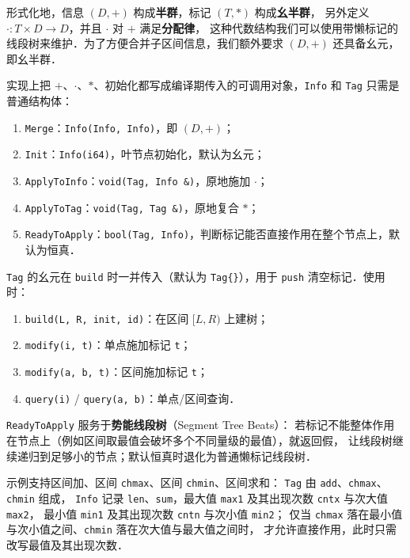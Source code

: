 形式化地，信息 $(D, +)$ 构成{\bf 半群}，标记 $(T, *)$ 构成{\bf 幺半群}，
另外定义 $\cdot: T \times D \rightarrow D$，并且 $\cdot$ 对 $+$ 满足{\bf 分配律}，
这种代数结构我们可以使用带懒标记的线段树来维护．为了方便合并子区间信息，我们额外要求 $(D, +)$ 还具备幺元，即幺半群．

实现上把 $+$、$\cdot$、$*$、初始化都写成编译期传入的可调用对象，{\tt Info} 和 {\tt Tag} 只需是普通结构体：

\begin{enumerate}[noitemsep]
    \item {\tt Merge}：{\tt Info(Info, Info)}，即 $(D, +)$；
    \item {\tt Init}：{\tt Info(i64)}，叶节点初始化，默认为幺元；
    \item {\tt ApplyToInfo}：{\tt void(Tag, Info \&)}，原地施加 $\cdot$；
    \item {\tt ApplyToTag}：{\tt void(Tag, Tag \&)}，原地复合 $*$；
    \item {\tt ReadyToApply}：{\tt bool(Tag, Info)}，判断标记能否直接作用在整个节点上，默认为恒真．
\end{enumerate}

{\tt Tag} 的幺元在 {\tt build} 时一并传入（默认为 {\tt Tag\{\}}），用于 {\tt push} 清空标记．使用时：

\begin{enumerate}[noitemsep]
    \item {\tt build(L, R, init, id)}：在区间 $[L, R)$ 上建树；
    \item {\tt modify(i, t)}：单点施加标记 {\tt t}；
    \item {\tt modify(a, b, t)}：区间施加标记 {\tt t}；
    \item {\tt query(i)} / {\tt query(a, b)}：单点/区间查询．
\end{enumerate}

{\tt ReadyToApply} 服务于{\bf 势能线段树}（Segment Tree Beats）：
若标记不能整体作用在节点上（例如区间取最值会破坏多个不同量级的最值），就返回假，
让线段树继续递归到足够小的节点；默认恒真时退化为普通懒标记线段树．

示例支持区间加、区间 {\tt chmax}、区间 {\tt chmin}、区间求和：
{\tt Tag} 由 {\tt add}、{\tt chmax}、{\tt chmin} 组成，
{\tt Info} 记录 {\tt len}、{\tt sum}，最大值 {\tt max1} 及其出现次数 {\tt cntx} 与次大值 {\tt max2}，
最小值 {\tt min1} 及其出现次数 {\tt cntn} 与次小值 {\tt min2}；
仅当 {\tt chmax} 落在最小值与次小值之间、{\tt chmin} 落在次大值与最大值之间时，
才允许直接作用，此时只需改写最值及其出现次数．

